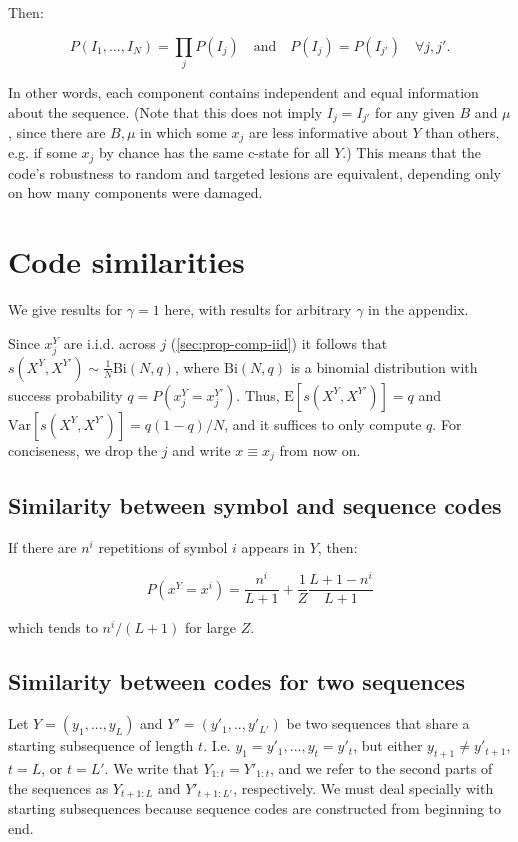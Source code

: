 \documentclass{article}
\begin{document}
Then:

$$P(I_1, ..., I_N) = \prod_j P(I_j) \quad \textrm{and} \quad P(I_j) = P(I_{j'}) \quad \forall j, j'.$$

In other words, each component contains independent and equal information about the sequence. (Note that this does not imply $I_j = I_{j'}$ for any given $B$ and $\mu$, since there are $B, \mu$ in which some $x_j$ are less informative about $Y$ than others, e.g. if some $x_j$ by chance has the same c-state for all $Y$.) This means that the code's robustness to random and targeted lesions are equivalent, depending only on how many components were damaged.

\section{Code similarities}

We give results for $\gamma = 1$ here, with results for arbitrary $\gamma$ in the appendix.

Since $x^Y_j$ are i.i.d. across $j$ (\ref{sec:prop-comp-iid}) it follows that $s(X^Y, X^{Y'}) \sim \frac{1}{N}\textrm{Bi}(N, q)$, where $\textrm{Bi}(N, q)$ is a binomial distribution with success probability $q = P(x^Y_j = x^{Y'}_j)$. Thus, $\textrm{E}[s(X^Y, X^{Y'})] = q$ and $\textrm{Var}[s(X^Y, X^{Y'})] = q(1-q)/N$, and it suffices to only compute $q$. For conciseness, we drop the $j$ and write $x \equiv x_j$ from now on. 

\subsection{Similarity between symbol and sequence codes}

If there are $n^i$ repetitions of symbol $i$ appears in $Y$, then:

$$P(x^Y = x^i) = \frac{n^i}{L+1} + \frac{1}{Z}\frac{L+1-n^i}{L+1}$$

which tends to $n^i/(L+1)$ for large $Z$.

\subsection{Similarity between codes for two sequences}

Let $Y = (y_1, ..., y_L)$ and $Y' = (y'_1, .., y'_{L'})$ be two sequences that share a starting subsequence of length $t$. I.e. $y_1 = y'_1, ..., y_t = y'_t$, but either $y_{t+1} \neq y'_{t+1}$, $t = L$, or $t = L'$. We write that $Y_{1:t} = Y'_{1:t}$, and we refer to the second parts of the sequences as $Y_{t+1:L}$ and $Y'_{t+1:L'}$, respectively. We must deal specially with starting subsequences because sequence codes are constructed from beginning to end.
\end{document}
